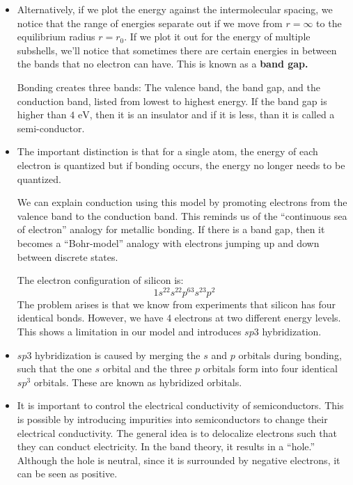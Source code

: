 \begin{itemize}
    \item Alternatively, if we plot the energy against the intermolecular spacing, we notice that the range of energies separate out if we move from $r=\infty$ to the equilibrium radius $r=r_0$. If we plot it out for the energy of multiple subshells, we'll notice that sometimes there are certain energies in between the bands that no electron can have. This is known as a \textbf{band gap.}
    \begin{idea}
        Bonding creates three bands: The valence band, the band gap, and the conduction band, listed from lowest to highest energy. If the band gap is higher than $4\text{ eV}$, then it is an insulator and if it is less, than it is called a semi-conductor.
    \end{idea}
    \item The important distinction is that for a single atom, the energy of each electron is quantized but if bonding occurs, the energy no longer needs to be quantized.
    \begin{idea}
        We can explain conduction using this model by promoting electrons from the valence band to the conduction band. This reminds us of the ``continuous sea of electron'' analogy for metallic bonding. If there is a band gap, then it becomes a ``Bohr-model'' analogy with electrons jumping up and down between discrete states.
    \end{idea}
    \begin{case}
        The electron configuration of silicon is:
        \begin{equation}
            1s^22s^22p^63s^23p^2
        \end{equation}
        The problem arises is that we know from experiments that silicon has four identical bonds. However, we have 4 electrons at two different energy levels. This shows a limitation in our model and introduces $sp3$ hybridization.
    \end{case}
    \item $sp3$ hybridization is caused by merging the $s$ and $p$ orbitals during bonding, such that the one $s$ orbital and the three $p$ orbitals form into four identical $sp^3$ orbitals. These are known as hybridized orbitals.
    \item It is important to control the electrical conductivity of semiconductors. This is possible by introducing impurities into semiconductors to change their electrical conductivity. The general idea is to delocalize electrons such that they can conduct electricity. In the band theory, it results in a ``hole.'' Although the hole is neutral, since it is surrounded by negative electrons, it can be seen as positive.

\end{itemize}
